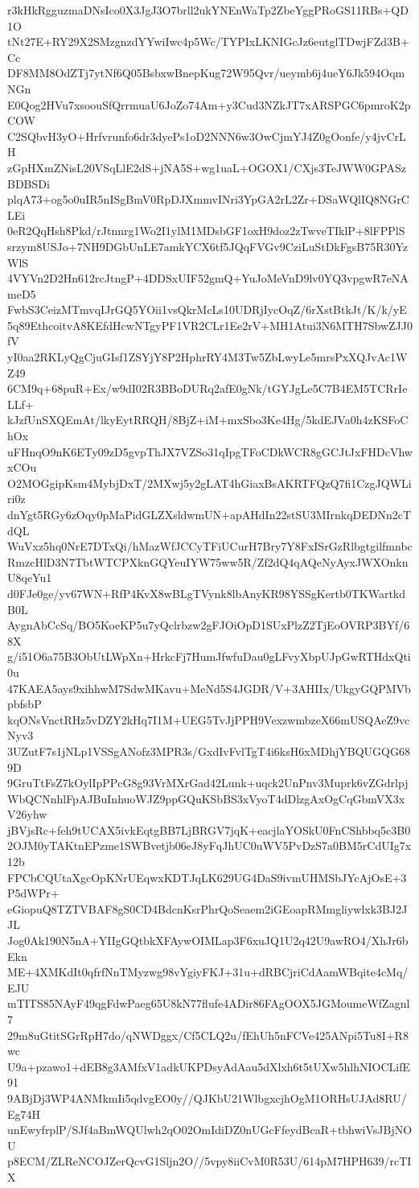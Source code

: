 r3kHkRgguzmaDNsIco0X3JgJ3O7brll2ukYNEnWaTp2ZbeYggPRoGS11RBs+QD1O
tNt27E+RY29X2SMzgnzdYYwiIwc4p5Wc/TYPIxLKNIGcJz6eutglTDwjFZd3B+Cc
DF8MM8OdZTj7ytNf6Q05BsbxwBnepKug72W95Qvr/ueymb6j4ueY6Jk594OqmNGn
E0Qog2HVu7xsoouSfQrrmuaU6JoZo74Am+y3Cud3NZkJT7xARSPGC6pmroK2pCOW
C2SQbvH3yO+Hrfvrunfo6dr3dyePs1oD2NNN6w3OwCjmYJ4Z0gOonfe/y4jvCrLH
zGpHXmZNisL20VSqLlE2dS+jNA5S+wg1uaL+OGOX1/CXjs3TeJWW0GPASzBDBSDi
plqA73+og5o0uIR5nISgBmV0RpDJXmmvINri3YpGA2rL2Zr+DSaWQlIQ8NGrCLEi
0eR2QqHsh8Pkd/rJtnnrg1Wo2I1ylM1MDsbGF1oxH9doz2zTwveTIklP+8lFPPlS
srzym8USJo+7NH9DGbUnLE7amkYCX6tf5JQqFVGv9CziLuStDkFgsB75R30YzWlS
4VYVn2D2Hn612rcJtngP+4DDSxUIF52gmQ+YuJoMeVnD9lv0YQ3vpgwR7eNAmeD5
FwbS3CeizMTmvqIJrGQ5YOii1vsQkrMcLs10UDRjIycOqZ/6rXstBtkJt/K/k/yE
5q89EthcoitvA8KEfdHcwNTgyPF1VR2CLr1Ee2rV+MH1Atui3N6MTH7SbwZJJ0fV
yI0aa2RKLyQgCjuGIsf1ZSYjY8P2HphrRY4M3Tw5ZbLwyLe5mrsPxXQJvAc1WZ49
6CM9q+68puR+Ex/w9dI02R3BBoDURq2afE0gNk/tGYJgLe5C7B4EM5TCRrIeLLf+
kJzfUnSXQEmAt/lkyEytRRQH/8BjZ+iM+mxSbo3Ke4Hg/5kdEJVa0h4zKSFoChOx
uFHnqO9nK6ETy09zD5gvpThJX7VZSo31qIpgTFoCDkWCR8gGCJtJxFHDcVhwxCOu
O2MOGgipKsm4MybjDxT/2MXwj5y2gLAT4hGiaxBsAKRTFQzQ7fi1CzgJQWLiri0z
dnYgt5RGy6zOqy0pMaPidGLZXsldwmUN+apAHdIn22stSU3MIrnkqDEDNn2cTdQL
WuVxz5hq0NrE7DTxQi/hMazWfJCCyTFiUCurH7Bry7Y8FxISrGzRlbgtgilfmnbc
RmzcHlD3N7TbtWTCPXknGQYeuIYW75ww5R/Zf2dQ4qAQeNyAyxJWXOnknU8qeYu1
d0FJe0ge/yv67WN+RfP4KvX8wBLgTVynk8lbAnyKR98YSSgKertb0TKWartkdB0L
AygnAbCcSq/BO5KoeKP5u7yQclrbzw2gFJOiOpD1SUxPlzZ2TjEoOVRP3BYf/68X
g/i51O6a75B3ObUtLWpXn+HrkcFj7HumJfwfuDau0gLFvyXbpUJpGwRTHdxQti0u
47KAEA5ays9xihhwM7SdwMKavu+MeNd5S4JGDR/V+3AHIIx/UkgyGQPMVbpbfsbP
kqONsVnctRHz5vDZY2kHq7I1M+UEG5TvJjPPH9VexzwmbzeX66mUSQAeZ9vcNyv3
3UZutF7s1jNLp1VSSgANofz3MPR3s/GxdIvFvlTgT4i6ksH6xMDhjYBQUGQG689D
9GruTtFsZ7kOylIpPPcG8g93VrMXrGad42Lunk+uqck2UnPnv3Muprk6vZGdrlpj
WbQCNnhlFpAJBuInhuoWJZ9ppGQuKSbBS3xVyoT4dDlzgAxOgCqGbmVX3xV26yhw
jBVjsRc+feh9tUCAX5ivkEqtgBB7LjBRGV7jqK+eacjlaYOSkU0FnCShbbq5c3B0
2OJM0yTAKtnEPzme1SWBvetjb06eJ8yFqJhUC0uWV5PvDzS7a0BM5rCdUIg7x12b
FPCbCQUtaXgcOpKNrUEqwxKDTJqLK629UG4DaS9ivmUHMSbJYcAjOsE+3P5dWPr+
eGiopuQ8TZTVBAF8gS0CD4BdcnKsrPhrQoSeaem2iGEoapRMmgliywlxk3BJ2JJL
Jog0Ak190N5nA+YIIgGQtbkXFAywOIMLap3F6xuJQ1U2q42U9awRO4/XhJr6bEkn
ME+4XMKdIt0qfrfNnTMyzwg98vYgiyFKJ+31u+dRBCjriCdAamWBqite4cMq/EJU
mTITS85NAyF49qgFdwPaeg65U8kN77flufe4ADir86FAgOOX5JGMoumeWfZagnl7
29m8uGtitSGrRpH7do/qNWDggx/Cf5CLQ2u/fEhUh5nFCVe425ANpi5Tu8I+R8wc
U9a+pzawo1+dEB8g3AMfxV1adkUKPDsyAdAau5dXlxh6t5tUXw5hlhNIOCLifE91
9ABjDj3WP4ANMkmIi5qdvgEO0y//QJKbU21WlbgxcjhOgM1ORHsUJAd8RU/Eg74H
unEwyfrplP/SJf4aBmWQUlwh2qO02OmIdiDZ0nUGcFfeydBcaR+tbhwiVsJBjNOU
p8ECM/ZLReNCOJZerQcvG1Sljn2O//5vpy8iiCvM0R53U/614pM7HPH639/rcTIX
